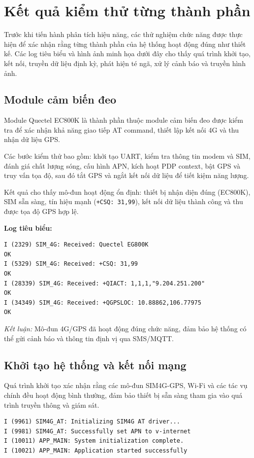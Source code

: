 \section{Kết quả kiểm thử từng thành phần}
\label{sec:component_testing}

Trước khi tiến hành phân tích hiệu năng, các thử nghiệm chức năng được thực hiện để xác nhận rằng từng thành phần của hệ thống hoạt động đúng như thiết kế.  
Các log tiêu biểu và hình ảnh minh họa dưới đây cho thấy quá trình khởi tạo, kết nối, truyền dữ liệu định kỳ, phát hiện té ngã, xử lý cảnh báo và truyền hình ảnh.

\subsection{Module cảm biến đeo}
Module Quectel EC800K là thành phần thuộc module cảm biến đeo được kiểm tra để xác nhận khả năng giao tiếp AT command, thiết lập kết nối 4G và thu nhận dữ liệu GPS.  

Các bước kiểm thử bao gồm: khởi tạo UART, kiểm tra thông tin modem và SIM, đánh giá chất lượng sóng, cấu hình APN, kích hoạt PDP context, bật GPS và truy vấn tọa độ, sau đó tắt GPS và ngắt kết nối dữ liệu để tiết kiệm năng lượng.  

Kết quả cho thấy mô-đun hoạt động ổn định: thiết bị nhận diện đúng (EC800K), SIM sẵn sàng, tín hiệu mạnh (\texttt{+CSQ: 31,99}), kết nối dữ liệu thành công và thu được tọa độ GPS hợp lệ.

\textbf{Log tiêu biểu:}
\begin{verbatim}
I (2329) SIM_4G: Received: Quectel EG800K
OK
I (5329) SIM_4G: Received: +CSQ: 31,99
OK
I (28339) SIM_4G: Received: +QIACT: 1,1,1,"9.204.251.200"
OK
I (34349) SIM_4G: Received: +QGPSLOC: 10.88862,106.77975
OK
\end{verbatim}

\textit{Kết luận:} Mô-đun 4G/GPS đã hoạt động đúng chức năng, đảm bảo hệ thống có thể gửi cảnh báo và thông tin định vị qua SMS/MQTT.

\subsection{Khởi tạo hệ thống và kết nối mạng}
Quá trình khởi tạo xác nhận rằng các mô-đun SIM4G-GPS, Wi-Fi và các tác vụ chính đều hoạt động bình thường, đảm bảo thiết bị sẵn sàng tham gia vào quá trình truyền thông và giám sát.

\begin{verbatim}
I (9961) SIM4G_AT: Initializing SIM4G AT driver...
I (9981) SIM4G_AT: Successfully set APN to v-internet
I (10011) APP_MAIN: System initialization complete.
I (10021) APP_MAIN: Application started successfully
\end{verbatim}

